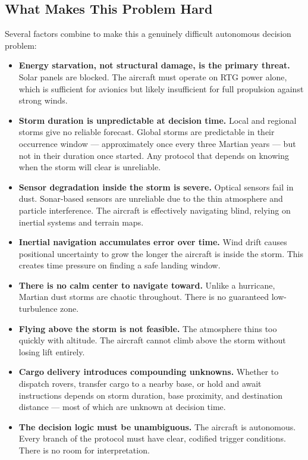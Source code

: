 \documentclass[a4paper,12pt]{article}
\begin{document}
\subsection{What Makes This Problem Hard}
Several factors combine to make this a genuinely difficult autonomous decision problem:

\begin{itemize}[itemsep=0.3em]
    \item \textbf{Energy starvation, not structural damage, is the primary threat.} Solar panels
    are blocked. The aircraft must operate on RTG power alone, which is sufficient for avionics
    but likely insufficient for full propulsion against strong winds.

    \item \textbf{Storm duration is unpredictable at decision time.} Local and regional storms
    give no reliable forecast. Global storms are predictable in their occurrence window —
    approximately once every three Martian years — but not in their duration once started.
    Any protocol that depends on knowing when the storm will clear is unreliable.

    \item \textbf{Sensor degradation inside the storm is severe.} Optical sensors fail in dust.
    Sonar-based sensors are unreliable due to the thin atmosphere and particle interference.
    The aircraft is effectively navigating blind, relying on inertial systems and terrain maps.

    \item \textbf{Inertial navigation accumulates error over time.} Wind drift causes positional
    uncertainty to grow the longer the aircraft is inside the storm. This creates time pressure
    on finding a safe landing window.

    \item \textbf{There is no calm center to navigate toward.} Unlike a hurricane, Martian
    dust storms are chaotic throughout. There is no guaranteed low-turbulence zone.

    \item \textbf{Flying above the storm is not feasible.} The atmosphere thins too quickly
    with altitude. The aircraft cannot climb above the storm without losing lift entirely.

    \item \textbf{Cargo delivery introduces compounding unknowns.} Whether to dispatch rovers,
    transfer cargo to a nearby base, or hold and await instructions depends on storm duration,
    base proximity, and destination distance — most of which are unknown at decision time.

    \item \textbf{The decision logic must be unambiguous.} The aircraft is autonomous. Every
    branch of the protocol must have clear, codified trigger conditions. There is no room for
    interpretation.
\end{itemize}
\end{document}
